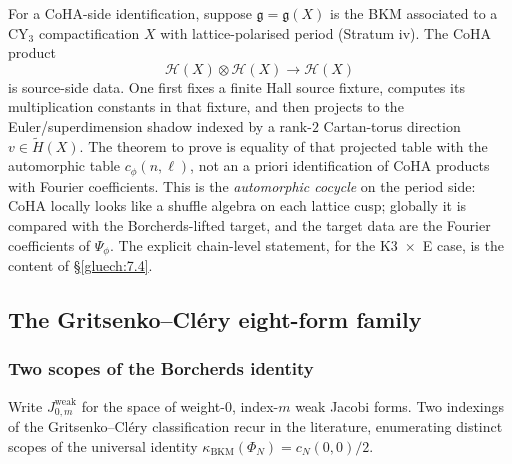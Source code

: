For a CoHA-side identification, suppose $\mathfrak g = \mathfrak g(X)$ is the BKM associated to a CY$_3$ compactification $X$ with lattice-polarised period (Stratum iv). The CoHA product
\[
 \mathcal H(X) \otimes \mathcal H(X) \longrightarrow \mathcal H(X)
\]
is source-side data. One first fixes a finite Hall source fixture, computes its multiplication constants in that fixture, and then projects to the Euler/superdimension shadow indexed by a rank-$2$ Cartan-torus direction $v \in \widetilde H(X)$. The theorem to prove is equality of that projected table with the automorphic table $c_\phi(n, \ell)$, not an a priori identification of CoHA products with Fourier coefficients. This is the \emph{automorphic cocycle} on the period side: CoHA locally looks like a shuffle algebra on each lattice cusp; globally it is compared with the Borcherds-lifted target, and the target data are the Fourier coefficients of $\Psi_\phi$. The explicit chain-level statement, for the K3~$\times$~E case, is the content of \S\ref{gluech:7.4}.

\subsection{The Gritsenko--Cl\'ery eight-form family}
\label{gluech:7.3}

\subsubsection{Two scopes of the Borcherds identity}

Write $J_{0, m}^{\mathrm{weak}}$ for the space of weight-$0$, index-$m$ weak Jacobi forms. Two indexings of the Gritsenko--Cl\'ery classification recur in the literature, enumerating distinct scopes of the universal identity $\kappa_{\mathrm{BKM}}(\Phi_N) = c_N(0, 0)/2$.

